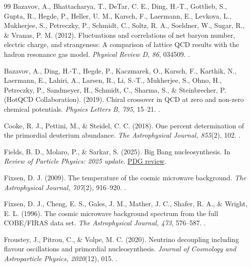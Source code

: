 \begin{thebibliography}{99}\small
\setlength{\itemsep}{2pt}
Bazavov, A., Bhattacharya, T., DeTar, C. E., Ding, H.-T., Gottlieb, S., Gupta, R., Hegde, P., Heller, U. M., Karsch, F., Laermann, E., Levkova, L., Mukherjee, S., Petreczky, P., Schmidt, C., Soltz, R. A., Soeldner, W., Sugar, R., \& Vranas, P. M. (2012).
Fluctuations and correlations of net baryon number, electric charge, and strangeness: A comparison of lattice QCD results with the hadron resonance gas model.
\emph{Physical Review D, 86}, 034509. .

Bazavov, A., Ding, H.-T., Hegde, P., Kaczmarek, O., Karsch, F., Karthik, N., Laermann, E., Lahiri, A., Larsen, R., Li, S.-T., Mukherjee, S., Ohno, H., Petreczky, P., Sandmeyer, H., Schmidt, C., Sharma, S., \& Steinbrecher, P. (HotQCD Collaboration). (2019).
Chiral crossover in QCD at zero and non-zero chemical potentials.
\emph{Physics Letters B, 795}, 15--21. .

Cooke, R. J., Pettini, M., \& Steidel, C. C. (2018).
One percent determination of the primordial deuterium abundance.
\emph{The Astrophysical Journal, 855}(2), 102.
.

Fields, B. D., Molaro, P., \& Sarkar, S. (2025).
Big Bang nucleosynthesis. In \emph{Review of Particle Physics: 2025 update}.
\href{https://pdg.lbl.gov/2025/reviews/rpp2025-rev-bbang-nucleosynthesis.pdf}{PDG review}.

Fixsen, D. J. (2009).
The temperature of the cosmic microwave background.
\emph{The Astrophysical Journal, 707}(2), 916--920.
.

Fixsen, D. J., Cheng, E. S., Gales, J. M., Mather, J. C., Shafer, R. A., \& Wright, E. L. (1996).
The cosmic microwave background spectrum from the full COBE/FIRAS data set.
\emph{The Astrophysical Journal, 473}, 576--587.
.

Froustey, J., Pitrou, C., \& Volpe, M. C. (2020).
Neutrino decoupling including flavour oscillations and primordial nucleosynthesis.
\emph{Journal of Cosmology and Astroparticle Physics, 2020}(12), 015.
.


\end{thebibliography}
